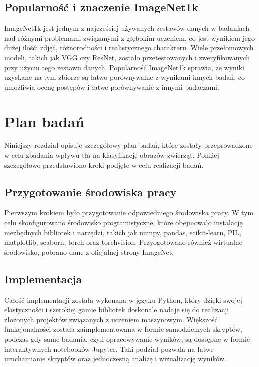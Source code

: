 \subsection*{Popularność i znaczenie ImageNet1k}

ImageNet1k jest jednym z najczęściej używanych zestawów danych w badaniach nad różnymi problemami związanymi z głębokim uczeniem, co jest wynikiem jego dużej ilośći zdjęć, różnorodności i realistycznego charakteru. Wiele przełomowych modeli, 
takich jak VGG czy ResNet, zostało przetestowanych i zweryfikowanych przy użyciu tego zestawu danych. Popularność ImageNet1k sprawia, że wyniki uzyskane na tym zbiorze są łatwo porównywalne z wynikami innych badań, co umożliwia ocenę 
postępów i łatwe porównywanie z innymi badaczami.


\section*{Plan badań}

Niniejszy rozdział opisuje szczegółowy plan badań, które zostały przeprowadzone w celu zbadania wpływu tła na klasyfikację obrazów zwierząt. Poniżej szczegółowo przedstawiono kroki podjęte w celu realizacji badań.

\subsection*{Przygotowanie środowiska pracy}

Pierwszym krokiem było przygotowanie odpowiedniego środowiska pracy. W tym celu skonfigurowano środowisko programistyczne, które obejmowało instalację niezbędnych bibliotek i narzędzi, takich jak numpy, pandas, scikit-learn, 
PIL, matplotlib, seaborn, torch oraz torchvision. Przyogotowano również wirtualne środowisko, pobrano dane z oficjalnej strony ImageNet. 

\subsection*{Implementacja}

Całość implementacji została wykonana w języku Python, który dzięki swojej elastyczności i szerokiej gamie bibliotek doskonale nadaje się do realizacji złożonych projektów związanych z uczeniem maszynowym. Większość funkcjonalności została 
zaimplementowana w formie samodzielnych skryptów, podczas gdy same badania, czyli opracowywanie wyników, są dostępne w formie interaktywnych notebooków Jupyter. Taki podział pozwala na łatwe uruchamianie skryptów oraz jednoczesną analizę i 
wizualizację wyników.

